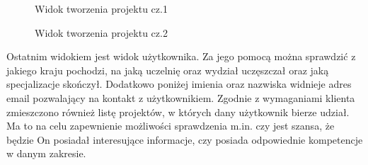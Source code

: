 \begin{figure}[h!]
	\caption{Widok tworzenia projektu cz.1}
	\centering
\end{figure}

\clearpage

\begin{figure}[h!]
	\caption{Widok tworzenia projektu cz.2}
	\centering
\end{figure}


Ostatnim widokiem jest widok użytkownika. Za jego pomocą można sprawdzić z jakiego kraju pochodzi, na jaką uczelnię oraz wydział uczęszczał oraz jaką specjalizacje skończył. Dodatkowo poniżej imienia oraz nazwiska widnieje adres email pozwalający na kontakt z użytkownikiem. Zgodnie z wymaganiami klienta zmieszczono również listę projektów, w których dany użytkownik bierze udział. Ma to na celu zapewnienie możliwości sprawdzenia m.in. czy jest szansa, że będzie On posiadał interesujące informacje, czy posiada odpowiednie kompetencje w danym zakresie.

